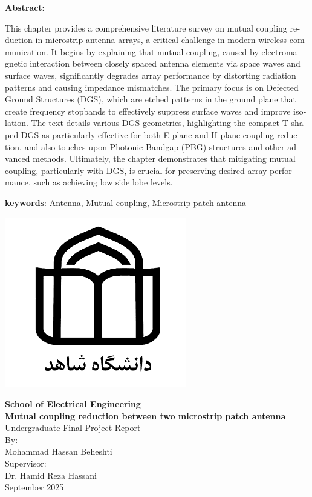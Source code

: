 \newpage
\thispagestyle{empty}
\begin{latin}
\textbf{Abstract:}

This chapter provides a comprehensive literature survey on mutual coupling 
reduction in microstrip antenna arrays, a critical challenge in modern wireless 
communication. It begins by explaining that mutual coupling, caused by 
electromagnetic interaction between closely spaced antenna elements via space 
waves and surface waves, significantly degrades array performance by distorting 
radiation patterns and causing impedance mismatches. The primary focus is on 
Defected Ground Structures (DGS), which are etched patterns in the ground plane 
that create frequency stopbands to effectively suppress surface waves and improve 
isolation. The text details various DGS geometries, highlighting the compact T-shaped 
DGS as particularly effective for both E-plane and H-plane coupling reduction, and 
also touches upon Photonic Bandgap (PBG) structures and other advanced methods. 
Ultimately, the chapter demonstrates that mitigating mutual coupling, particularly 
with DGS, is crucial for preserving desired array performance, such as achieving low side lobe levels.

\textbf{keywords}: 
Antenna, Mutual coupling, Microstrip patch antenna
\end{latin}
\newpage
\thispagestyle{empty}
\vspace*{-28mm}

\centerline{\includegraphics[scale=0.5]{./Images/general/logo_en.png}}
\begin{latin}
\begin{center}
\large
\vspace{-1mm}
\textbf{School of Electrical Engineering}
\\[3cm]
\textbf{Mutual coupling reduction between two microstrip patch antenna}
\\[1.5cm]
Undergraduate Final Project Report
\\[4cm]
By: 
\\[0.5cm]
Mohammad Hassan Beheshti
\\[1cm]
Supervisor:
\\[0.5cm]
Dr. Hamid Reza Hassani
\\[2cm]
September 2025

\end{center}
\end{latin}